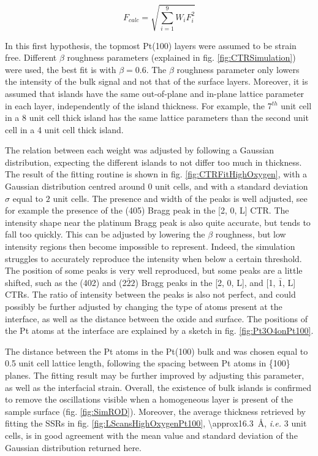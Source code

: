 \begin{equation}
    F_{calc} = \sqrt{\sum_{i=1}^{9} W_i F_i^2}
    \label{eq:Fcalc}
\end{equation}


In this first hypothesis, the topmost Pt(100) layers were assumed to be strain free.
Different $\beta$ roughness parameters (explained in fig. \ref{fig:CTRSimulation}) were used, the best fit is with $\beta = \num{0.6}$.
The $\beta$ roughness parameter only lowers the intensity of the bulk signal and not that of the surface layers.
Moreover, it is assumed that  islands have the same out-of-plane and in-plane lattice parameter in each layer, independently of the island thickness.
For example, the 7$^{th}$ unit cell in a \num{8} unit cell thick island has the same lattice parameters than the second unit cell in a \num{4} unit cell thick island.

The relation between each weight was adjusted by following a Gaussian distribution, expecting the different islands to not differ too much in thickness.
The result of the fitting routine is shown in fig. \ref{fig:CTRFitHighOxygen}, with a Gaussian distribution centred around $0$ unit cells, and with a standard deviation $\sigma$ equal to $2$ unit cells.
The presence and width of the  peaks is well adjusted, see for example the presence of the (405)  Bragg peak in the [2, 0, L] CTR.
The intensity shape near the platinum Bragg peak is also quite accurate, but tends to fall too quickly.
This can be adjusted by lowering the $\beta$ roughness, but low intensity regions then become impossible to represent.
Indeed, the simulation struggles to accurately reproduce the intensity when below a certain threshold.
The position of some peaks is very well reproduced, but some peaks are a little shifted, such as the (402) and (2$\bar{2}2$)  Bragg peaks in the [2, 0, L], and [1, $\bar{1}$, L] CTRs.
The ratio of intensity between the  peaks is also not perfect, and could possibly be further adjusted by changing the type of atoms present at the interface, as well as the distance between the oxide and surface.
The positions of the Pt atoms at the interface are explained by a sketch in fig. \ref{fig:Pt3O4onPt100}.

The distance between the Pt atoms in the Pt(100) bulk and  was chosen equal to \num{0.5} unit cell lattice length, following the spacing between Pt atoms in \{100\} planes.
The fitting result may be further improved by adjusting this parameter, as well as the interfacial strain.
Overall, the existence of bulk  islands is confirmed to remove the oscillations visible when a homogeneous layer is present of the sample surface (fig. \ref{fig:SimROD}).
Moreover, the average thickness retrieved by fitting the SSRs in fig. \ref{fig:LScansHighOxygenPt100}, \qty{\approx16.3}{\angstrom}, \textit{i.e.} 3 unit cells, is in good agreement with the mean value and standard deviation of the Gaussian distribution returned here.

